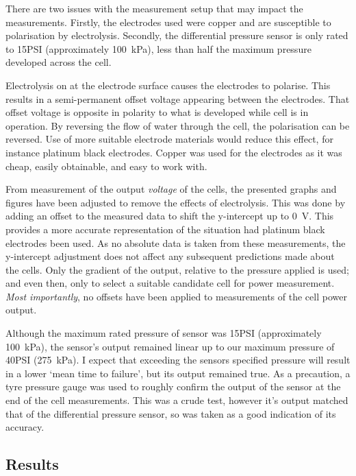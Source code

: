     There are two issues with the measurement setup that may impact the measurements.
    Firstly, the electrodes used were copper and are susceptible to polarisation by electrolysis.
    Secondly, the differential pressure sensor is only rated to 15\thinspace PSI (approximately \SI{100}{\kilo\pascal}), less than half the maximum pressure developed across the cell.

    Electrolysis on at the electrode surface causes the electrodes to polarise.
    This results in a semi-permanent offset voltage appearing between the electrodes.
    That offset voltage is opposite in polarity to what is developed while cell is in operation.
    By reversing the flow of water through the cell, the polarisation can be reversed.
    Use of more suitable electrode materials would reduce this effect, for instance platinum black electrodes.
    Copper was used for the electrodes as it was cheap, easily obtainable, and easy to work with.

    From measurement of the output \emph{voltage} of the cells, the presented graphs and figures have been adjusted to remove the effects of electrolysis.
    This was done by adding an offset to the measured data to shift the y-intercept up to \SI{0}{\volt}.
    This provides a more accurate representation of the situation had platinum black electrodes been used.
    As no absolute data is taken from these measurements, the y-intercept adjustment does not affect any subsequent predictions made about the cells.
    Only the gradient of the output, relative to the pressure applied is used; and even then, only to select a suitable candidate cell for power measurement.
    \emph{Most importantly}, no offsets have been applied to measurements of the cell power output.

    Although the maximum rated pressure of sensor was 15\thinspace PSI (approximately \SI{100}{\kilo\pascal}), the sensor's output remained linear up to our maximum pressure of 40\thinspace PSI (\SI{275}{\kilo\pascal}).
    I expect that exceeding the sensors specified pressure will result in a lower `mean time to failure', but its output remained true.
    As a precaution, a tyre pressure gauge was used to roughly confirm the output of the sensor at the end of the cell measurements.
    This was a crude test, however it's output matched that of the differential pressure sensor, so was taken as a good indication of its accuracy.

\subsection{Results}

